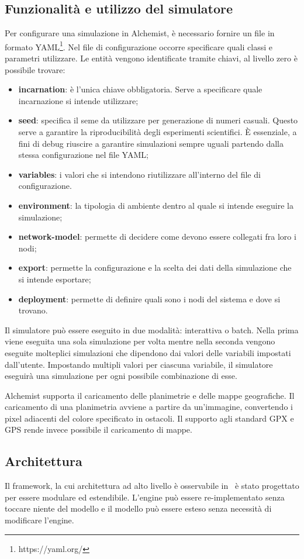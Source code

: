 \documentclass[12pt,a4paper,openright,twoside]{book}
\begin{document}
\subsection{Funzionalità e utilizzo del simulatore}
Per configurare una simulazione in Alchemist, è necessario fornire un file in formato YAML\footnote{https://yaml.org/}. Nel file di configurazione occorre specificare quali classi e parametri utilizzare. Le entità vengono identificate tramite chiavi, al livello zero è possibile trovare: 
\begin{itemize}
    \item \textbf{incarnation}: è l'unica chiave obbligatoria. Serve a specificare quale incarnazione si intende utilizzare; 
    \item \textbf{seed}: specifica il seme da utilizzare per generazione di numeri casuali. Questo serve a garantire la riproducibilità degli esperimenti scientifici. È essenziale, a fini di debug riuscire a garantire simulazioni sempre uguali partendo dalla stessa configurazione nel file YAML;
    \item \textbf{variables}: i valori che si intendono riutilizzare all'interno del file di configurazione. 
    \item \textbf{environment}: la tipologia di ambiente dentro al quale si intende eseguire la simulazione;
    \item \textbf{network-model}: permette di decidere come devono essere collegati fra loro i nodi;
    \item \textbf{export}: permette la configurazione e la scelta dei dati della simulazione che si intende esportare; 
    \item \textbf{deployment}: permette di definire quali sono i nodi del sistema e dove si trovano. 
\end{itemize}
Il simulatore può essere eseguito in due modalità: interattiva o batch. Nella prima viene eseguita una sola simulazione per volta mentre nella seconda vengono eseguite molteplici simulazioni che dipendono dai valori delle variabili impostati dall'utente. Impostando multipli valori per ciascuna variabile, il simulatore eseguirà una simulazione per ogni possibile combinazione di esse. 

Alchemist supporta il caricamento delle planimetrie e delle mappe geografiche. Il caricamento di una planimetria avviene a partire da un'immagine, convertendo i pixel adiacenti del colore specificato in ostacoli. Il supporto agli standard GPX e GPS rende invece possibile il caricamento di mappe. 
\subsection{Architettura}
Il framework, la cui architettura ad alto livello è osservabile in~ è stato progettato per essere modulare ed estendibile. L'engine può essere re-implementato senza toccare niente del modello e il modello può essere esteso senza necessità di modificare l'engine. 
\end{document}
